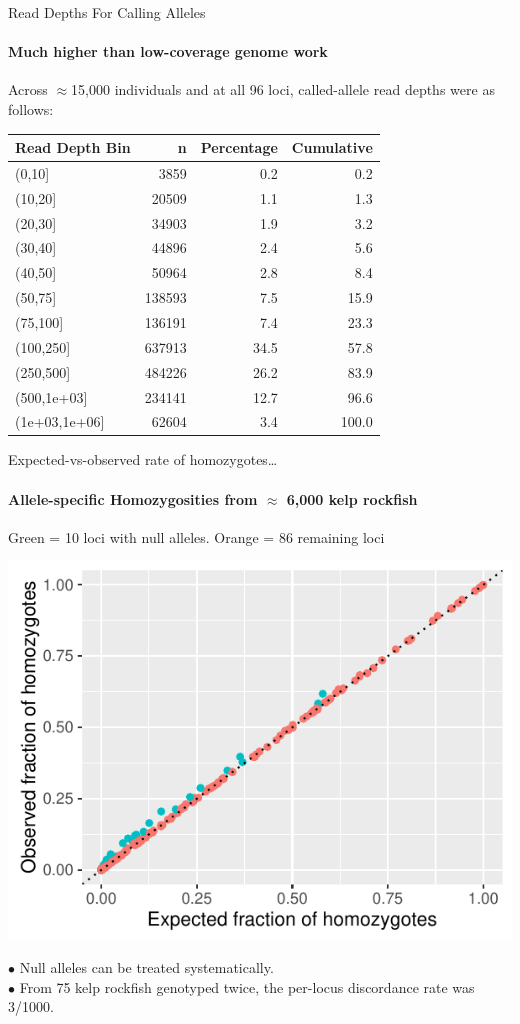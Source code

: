 \documentclass[letter,graphicx]{beamer}
\begin{document}
\begin{frame}{Read Depths For Calling Alleles}
\framesubtitle{Much higher than low-coverage genome work}

Across $\approx$15,000 individuals and at all 96 loci, called-allele read depths 
were as follows:

\begin{center}
\begin{tabular}{lrrr}
Read Depth Bin  &  n  &  Percentage  &  Cumulative\\ \hline
(0,10]  &  3859  &  0.2  &  0.2\\
(10,20]  &  20509  &  1.1  &  1.3\\
(20,30]  &  34903  &  1.9  &  3.2\\
(30,40]  &  44896  &  2.4  &  5.6\\
(40,50]  &  50964  &  2.8  &  8.4\\
(50,75]  &  138593  &  7.5  &  15.9\\
(75,100]  &  136191  &  7.4  &  23.3\\
(100,250]  &  637913  &  34.5  &  57.8\\
(250,500]  &  484226  &  26.2  &  83.9\\
(500,1e+03]  &  234141  &  12.7  &  96.6\\
(1e+03,1e+06]  &  62604  &  3.4  &  100.0\\
\end{tabular}
\end{center}
\end{frame}





\begin{frame}{Expected-vs-observed rate of homozygotes\ldots}
\framesubtitle{Allele-specific Homozygosities from $\approx$ 6,000 kelp rockfish}
Green = 10 loci with null alleles.  Orange = 86 remaining loci
\begin{center}
\includegraphics[width=.7\textwidth]{./figs/microhap_homozyg.pdf}
\end{center}
$\bullet$ Null alleles can be treated systematically.\\
$\bullet$ From 75 kelp rockfish genotyped twice, the per-locus discordance rate was 3/1000.
\end{frame}
\end{document}
